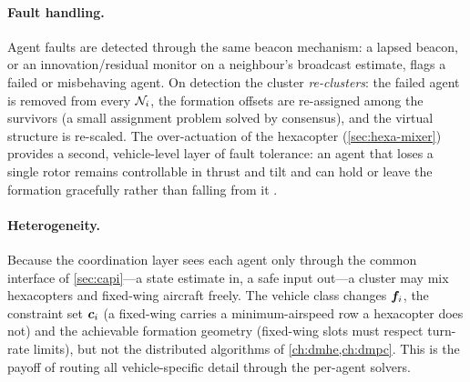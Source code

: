 \paragraph{Fault handling.} Agent faults are detected through the same beacon
mechanism: a lapsed beacon, or an innovation/residual monitor on a neighbour's
broadcast estimate, flags a failed or misbehaving agent. On detection the cluster
\emph{re-clusters}: the failed agent is removed from every $\mathcal{N}_i$, the
formation offsets are re-assigned among the survivors (a small assignment problem
solved by consensus), and the virtual structure is re-scaled. The over-actuation
of the hexacopter (\cref{sec:hexa-mixer}) provides a second, vehicle-level layer
of fault tolerance: an agent that loses a single rotor remains controllable in
thrust and tilt and can hold or leave the formation gracefully rather than
falling from it \cite{michieletto2018fundamental}.

\paragraph{Heterogeneity.} Because the coordination layer sees each agent only
through the common interface of \cref{sec:capi}---a state estimate in, a safe
input out---a cluster may mix hexacopters and fixed-wing aircraft freely. The
vehicle class changes $\bm{f}_i$, the constraint set $\bm{c}_i$ (a fixed-wing
carries a minimum-airspeed row a hexacopter does not) and the achievable
formation geometry (fixed-wing slots must respect turn-rate limits), but not the
distributed algorithms of \cref{ch:dmhe,ch:dmpc}. This is the payoff of routing
all vehicle-specific detail through the per-agent solvers.
